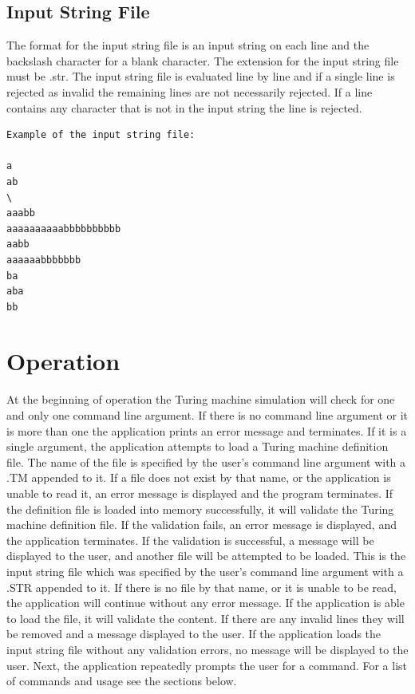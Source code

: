 \documentclass{report}
\begin{document}
\section{Input String File}

The format for the input string file is an input string on each line and the backslash character for a blank character. The extension for the input string file must be .str. The input string file is evaluated line by line and if a single line is rejected as invalid the remaining lines are not necessarily rejected. If a line contains any character that is not in the input string the line is rejected.

\begin{verbatim}
Example of the input string file: 

a
ab
\
aaabb
aaaaaaaaaabbbbbbbbbb
aabb
aaaaaabbbbbbb
ba
aba
bb
\end{verbatim}    
    

\chapter{Operation}

	At the beginning of operation the Turing machine simulation will check for one and only one command line argument. If there is no command line argument or it is more than one the application prints an error message and terminates. If it is a single argument, the application attempts to load a Turing machine definition file. The name of the file is specified by the user's command line argument with a .TM appended to it. If a file does not exist by that name, or the application is unable to read it, an error message is displayed and the program terminates. If the definition file is loaded into memory successfully, it will validate the Turing machine definition file. If the validation fails, an error message is displayed, and the application terminates. If the validation is successful, a message will be displayed to the user, and another file will be attempted to be loaded. This is the input string file which was specified by the user's command line argument with a .STR appended to it. If there is no file by that name, or it is unable to be read, the application will continue without any error message. If the application is able to load the file, it will validate the content. If there are any invalid lines they will be removed and a message displayed to the user. If the application loads the input string file without any validation errors, no message will be displayed to the user. Next, the application repeatedly prompts the user for a command. For a list of commands and usage see the sections below.
\end{document}
